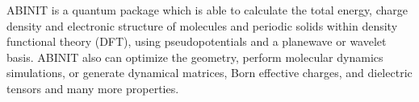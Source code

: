 ABINIT is a quantum package which is able to calculate the total energy, charge density and electronic structure of molecules and periodic solids within density functional theory (DFT), using pseudopotentials and a planewave or wavelet basis. ABINIT also can optimize the geometry, perform molecular dynamics simulations, or generate dynamical matrices, Born effective charges, and dielectric tensors and many more properties. 